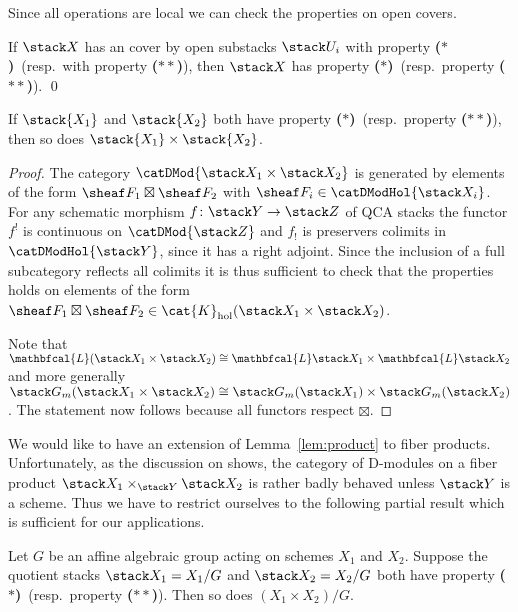 \documentclass{ck-article}
\newcommand\bc{\textbf{($\mathbf{*}$)}}
\newcommand\hbc{\textbf{($\mathbf{**}$)}}
\newcommand\catK[2][]{\cat{K}_{#1}(#2)}
\newcommand\catKHol[1]{\catK[\mathrm{hol}]{#1}}
\renewcommand\ls[1]{\mathbfcal{L} #1}
\begin{document}
Since all operations are local we can check the properties on open covers.

\begin{Lem}\label{lem:open_cover}
    If $\stack X$ has an cover by open substacks $\stack U_i$ with property \bc\ (resp.~with property \hbc), then $\stack X$ has property \bc\ (resp.~property \hbc).
    \qed
\end{Lem}

\begin{Lem}\label{lem:product}
    If $\stack{X_1}$ and $\stack{X_2}$ both have property \bc\ (resp.~property \hbc), then so does $\stack{X_1} \times \stack{X_2}$.
\end{Lem}

\begin{proof}
    The category $\catDMod{\stack X_1 \times \stack X_2}$ is generated by elements of the form $\sheaf F_1 \boxtimes \sheaf F_2$ with $\sheaf F_i \in \catDModHol{\stack X_i}$.
    For any schematic morphism $f\colon \stack Y \to \stack Z$ of QCA stacks the functor $f^!$ is continuous on $\catDMod{\stack Z}$ and $f_!$ is preservers colimits in $\catDModHol{\stack Y}$, since it has a right adjoint.
    Since the inclusion of a full subcategory reflects all colimits it is thus sufficient to check that the properties holds on elements of the form $\sheaf F_1 \boxtimes \sheaf F_2 \in \catKHol{\stack X_1 \times \stack X_2}$.
    
    Note that $\ls(\stack X_1 \times \stack X_2) \cong \ls \stack X_1 \times \ls \stack X_2$ and more generally $\stack G_m(\stack X_1 \times \stack X_2) \cong \stack G_m(\stack X_1) \times \stack G_m(\stack X_2)$.
    The statement now follows because all functors respect $\boxtimes$.
\end{proof}

We would like to have an extension of Lemma~\ref{lem:product} to fiber products.
Unfortunately, as the discussion on \cite[Section~1.2]{BenZviNadler:arXiv:CharacterTheoryOfAComplexGroup} shows, the category of D-modules on a fiber product $\stack X_1 \times_{\stack Y} \stack X_2$ is rather badly behaved unless $\stack Y$ is a scheme.
Thus we have to restrict ourselves to the following partial result which is sufficient for our applications.

\begin{Lem}\label{lem:product_quotient}
  Let $G$ be an affine algebraic group acting on schemes $X_1$ and $X_2$.
  Suppose the quotient stacks $\stack X_1 = X_1/G$ and $\stack X_2 = X_2/G$ both have property \bc\ (resp.~property \hbc).
  Then so does $(X_1 \times X_2)/G$.
\end{Lem}
\end{document}
